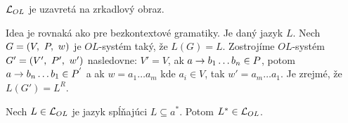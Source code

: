 


\begin{veta}
  $\mathcal{L}_{OL}$ je uzavretá na zrkadlový obraz.
\end{veta}

\begin{dokaz}
  Idea je rovnaká ako pre bezkontextové gramatiky. Je daný jazyk $L$.
  Nech $G = (V,\ P,\ w)$ je $OL$-systém taký, že $L(G) = L$.
  Zostrojíme $OL$-systém $G' = (V',\ P',\ w')$ nasledovne:
  $V' = V$, ak ${a \rightarrow b_1 \dots b_n} \in P$,
  potom ${a \rightarrow b_n \dots b_1} \in P^{'}$ a ak
  $w = a_1 \dots a_m$ kde $a_i \in V$,
  tak $w' = a_m \dots a_1$. Je zrejmé, že $L(G') = L^{R}$.
\end{dokaz}


\begin{veta}
  Nech $L \in \mathcal{L}_{OL}$ je jazyk spĺňajúci $L \subseteq a^{*}$.
  Potom $L^{*} \in \mathcal{L}_{OL}$.
\end{veta}


